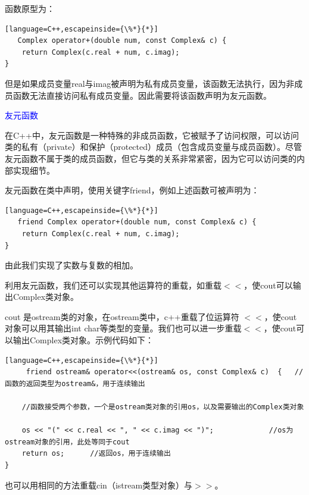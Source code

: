 \documentclass[UTF8]{ctexart}
\begin{document}
函数原型为：
\begin{lstlisting}[language=C++,escapeinside={\%*}{*}]
   Complex operator+(double num, const Complex& c) {
	return Complex(c.real + num, c.imag); 
}
\end{lstlisting}
但是如果成员变量real与imag被声明为私有成员变量，该函数无法执行，因为非成员函数无法直接访问私有成员变量。因此需要将该函数声明为友元函数。

\textcolor{blue}{友元函数}

在C++中，友元函数是一种特殊的非成员函数，它被赋予了访问权限，可以访问类的私有（private）和保护（protected）成员（包含成员变量与成员函数）。尽管友元函数不属于类的成员函数，但它与类的关系非常紧密，因为它可以访问类的内部实现细节。

友元函数在类中声明，使用关键字friend，例如上述函数可被声明为：
\begin{lstlisting}[language=C++,escapeinside={\%*}{*}]
   friend Complex operator+(double num, const Complex& c) {
	return Complex(c.real + num, c.imag); 
}
\end{lstlisting}
由此我们实现了实数与复数的相加。

利用友元函数，我们还可以实现其他运算符的重载，如重载$<<$，使cout可以输出Complex类对象。

cout 是ostream类的对象，在ostream类中，c++重载了位运算符 $<<$，使cout对象可以用其输出int char等类型的变量。我们也可以进一步重载$<<$，使cout可以输出Complex类对象。示例代码如下：
\begin{lstlisting}[language=C++,escapeinside={\%*}{*}]
     friend ostream& operator<<(ostream& os, const Complex& c) 	{ 	//函数的返回类型为ostream&，用于连续输出
	
	//函数接受两个参数，一个是ostream类对象的引用os，以及需要输出的Complex类对象
	
	os << "(" << c.real << ", " << c.imag << ")"; 			  //os为ostream对象的引用，此处等同于cout
	return os;  	//返回os，用于连续输出
}
\end{lstlisting}
也可以用相同的方法重载cin（istream类型对象）与$>>$。
\end{document}
